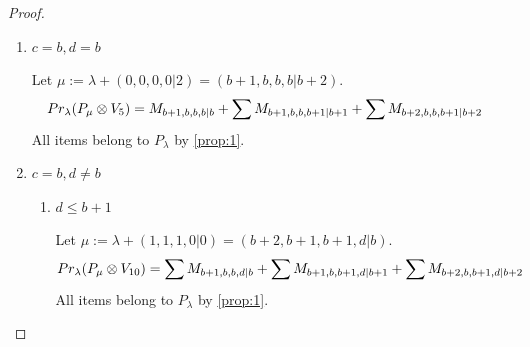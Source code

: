 \begin{proof}
\begin{enumerate}
\begin{enumerate}
      \item $ c=b, d=b $ \par
        Let $\mu:=\lambda + (0,0,0,0|2) = (b+1,b,b,b|b+2) $.
        \begin{equation}\notag
          \begin{aligned}
            Pr_{\lambda}(P_\mu \otimes V_{5}) &=
 M_{b+1,b,b,b|b}
+\sum M_{b+1,b,b,b+1|b+1}
+\sum M_{b+2,b,b,b+1|b+2}
          \end{aligned}
        \end{equation}
All items belong to $P_\lambda$ by \cref{prop:1}.

      \item $ c = b , d \neq b $ \par
        \begin{enumerate}
          \item $ d \leq b+1 $\par
        Let $\mu:=\lambda + (1,1,1,0|0) = (b+2,b+1,b+1,d|b) $.
        \begin{equation}\notag
          \begin{aligned}
            Pr_{\lambda}(P_\mu \otimes V_{10}) &=
 \sum M_{b+1,b,b,d|b}
+\sum M_{b+1,b,b+1,d|b+1}
+\sum M_{b+2,b,b+1,d|b+2}
          \end{aligned}
        \end{equation}
All items belong to $P_\lambda$ by \cref{prop:1}.


\end{enumerate}
\end{enumerate}
\end{enumerate}
\end{proof}
